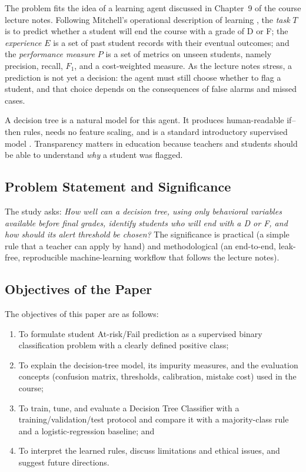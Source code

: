 \documentclass[12pt,a4paper]{article}
\theoremstyle{definition}
\begin{document}
The problem fits the idea of a learning agent discussed in Chapter~9 of the course lecture notes. Following Mitchell's operational description of learning \cite{mitchell1997}, the \emph{task} $T$ is to predict whether a student will end the course with a grade of D or F; the \emph{experience} $E$ is a set of past student records with their eventual outcomes; and the \emph{performance measure} $P$ is a set of metrics on unseen students, namely precision, recall, $F_1$, and a cost-weighted measure. As the lecture notes stress, a prediction is not yet a decision: the agent must still choose whether to flag a student, and that choice depends on the consequences of false alarms and missed cases.

A decision tree is a natural model for this agent. It produces human-readable if--then rules, needs no feature scaling, and is a standard introductory supervised model \cite{russell2022}. Transparency matters in education because teachers and students should be able to understand \emph{why} a student was flagged.

\subsection{Problem Statement and Significance}

The study asks: \emph{How well can a decision tree, using only behavioral variables available before final grades, identify students who will end with a D or F, and how should its alert threshold be chosen?} The significance is practical (a simple rule that a teacher can apply by hand) and methodological (an end-to-end, leak-free, reproducible machine-learning workflow that follows the lecture notes).

\subsection{Objectives of the Paper}

The objectives of this paper are as follows:

\begin{enumerate}[label=\arabic*.]
    \item To formulate student At-risk/Fail prediction as a supervised binary classification problem with a clearly defined positive class;
    \item To explain the decision-tree model, its impurity measures, and the evaluation concepts (confusion matrix, thresholds, calibration, mistake cost) used in the course;
    \item To train, tune, and evaluate a Decision Tree Classifier with a training/validation/test protocol and compare it with a majority-class rule and a logistic-regression baseline; and
    \item To interpret the learned rules, discuss limitations and ethical issues, and suggest future directions.
\end{enumerate}
\end{document}
